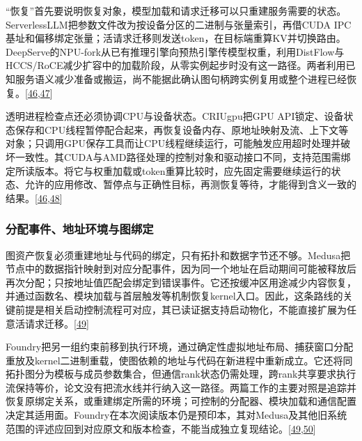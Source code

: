 \documentclass[
  UTF8,
  zihao=5]{ctexart}
\begin{document}
``恢复''首先要说明恢复对象，模型加载和请求迁移可以只重建服务需要的状态。ServerlessLLM把参数文件改为按设备分区的二进制与张量索引，再借CUDA
IPC基址和偏移绑定张量；活请求迁移则发送token，在目标端重算KV并切换路由。DeepServe的NPU-fork从已有推理引擎向预热引擎传模型权重，利用DistFlow与HCCS/RoCE减少扩容中的加载阶段，从零实例起步时没有这一路径。两者利用已知服务语义减少准备或搬运，尚不能据此确认图句柄跨实例复用或整个进程已经恢复。{[}\protect\hyperlink{ref-fu2024serverlessllm}{46},\protect\hyperlink{ref-hu2025deepserve}{47}{]}

透明进程检查点还必须协调CPU与设备状态。CRIUgpu把GPU
API锁定、设备状态保存和CPU线程暂停配合起来，再恢复设备内存、原地址映射及流、上下文等对象；只调用GPU保存工具而让CPU线程继续运行，可能触发应用超时处理并破坏一致性。其CUDA与AMD路径处理的控制对象和驱动接口不同，支持范围需绑定所读版本。将它与权重加载或token重算比较时，应先固定需要继续运行的状态、允许的应用修改、暂停点与正确性目标，再测恢复等待，才能得到含义一致的结果。{[}\protect\hyperlink{ref-fu2024serverlessllm}{46},\protect\hyperlink{ref-stoyanov2025criugpu}{48}{]}

\hypertarget{ux5206ux914dux4e8bux4ef6ux5730ux5740ux73afux5883ux4e0eux56feux7ed1ux5b9a}{%
\subsubsection{分配事件、地址环境与图绑定}\label{ux5206ux914dux4e8bux4ef6ux5730ux5740ux73afux5883ux4e0eux56feux7ed1ux5b9a}}

图资产恢复必须重建地址与代码的绑定，只有拓扑和数据字节还不够。Medusa把节点中的数据指针映射到对应分配事件，因为同一个地址在启动期间可能被释放后再次分配；只按地址值匹配会绑定到错误事件。它还按缓冲区用途减少内容恢复，并通过函数名、模块加载与首层触发等机制恢复kernel入口。因此，这条路线的关键前提是相关启动控制流程可对应，其已读证据支持启动物化，不能直接扩展为任意活请求迁移。{[}\protect\hyperlink{ref-zeng2025medusa}{49}{]}

Foundry把另一组约束前移到执行环境，通过确定性虚拟地址布局、捕获窗口分配重放及kernel二进制重载，使图依赖的地址与代码在新进程中重新成立。它还将同拓扑图分为模板与成员参数集合，但通信rank状态仍需处理，跨rank共享要求执行流保持等价，论文没有把流水线并行纳入这一路径。两篇工作的主要对照是追踪并恢复原绑定关系，或重建绑定所需的环境；可控制的分配器、模块加载和通信配置决定其适用面。Foundry在本次阅读版本仍是预印本，其对Medusa及其他旧系统范围的评述应回到对应原文和版本检查，不能当成独立复现结论。{[}\protect\hyperlink{ref-zeng2025medusa}{49},\protect\hyperlink{ref-liu2026foundry}{50}{]}
\end{document}
